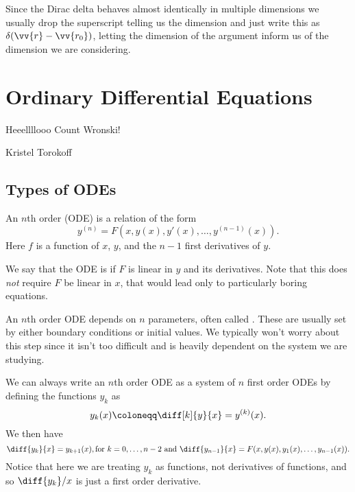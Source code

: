 \documentclass[fleqn]{NotesClass}
\begin{document}
    Since the Dirac delta behaves almost identically in multiple dimensions we usually drop the superscript telling us the dimension and just write this as \(\delta(\vv{r} - \vv{r_0})\), letting the dimension of the argument inform us of the dimension we are considering.
    
    \chapter{Ordinary Differential Equations}
    \epigraph{Heeellllooo Count Wronski!}{Kristel Torokoff}
    \section{Types of ODEs}
    An \(n\)th order  (ODE) is a relation of the form
    \begin{equation}
        y^{(n)} = F(x, y(x), y'(x), \dotsc, y^{(n-1)}(x)).
    \end{equation}
    Here \(f\) is a function of \(x\), \(y\), and the \(n - 1\) first derivatives of \(y\).
    
    We say that the ODE is  if \(F\) is linear in \(y\) and its derivatives.
    Note that this does \emph{not} require \(F\) be linear in \(x\), that would lead only to particularly boring equations.
    
    An \(n\)th order ODE depends on \(n\) parameters, often called .
    These are usually set by either boundary conditions or initial values.
    We typically won't worry about this step since it isn't too difficult and is heavily dependent on the system we are studying.
    
    We can always write an \(n\)th order ODE as a system of \(n\) first order ODEs by defining the functions \(y_k\) as
    \begin{equation}
        y_k(x) \coloneqq \diff[k]{y}{x} = y^{(k)}(x).
    \end{equation}
    We then have
    \begin{equation}
        \diff{y_k}{x} = y_{k+1}(x), \text{for \(k = 0, \dotsc, n - 2\) and } \diff{y_{n-1}}{x} = F(x, y(x), y_1(x), \dotsc, y_{n-1}(x)).
    \end{equation}
    Notice that here we are treating \(y_k\) as functions, not derivatives of functions, and so \(\diff{y_k}/{x}\) is just a first order derivative.
    
\end{document}
